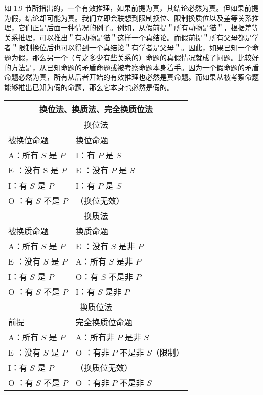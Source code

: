 如 1.9 节所指出的，一个有效推理，如果前提为真，其结论必然为真。但如果前提为假，结论却可能为真。我们立即会联想到限制换位、限制换质位以及差等关系推理，它们正是后面一种情况的例子。例如，从假前提＂所有动物是猫＂，根据差等关系推理，可以推出＂有动物是猫＂这样一个真结论。而假前提＂所有父母都是学者＂限制换位后也可以得到一个真结论＂有学者是父母＂。因此，如果已知一个命题为假，那么另一个（与之多少有些关系的）命题的真假情况就成了问题。比较好的方法是，从已知命题的矛盾命题或被考察命题本身着手。因为一个假命题的矛盾命题必然为真，所有从后者开始的有效推理也必然是真命题。而如果从被考察命题能够推出已知为假的命题，那么它本身也必然是假的。

\begin{center}
\begin{tabular}{|l|l|}
\hline
\multicolumn{2}{|c|}{换位法、换质法、完全换质位法} \\
\hline
\multicolumn{2}{|c|}{换位法} \\
\hline
被换位命题 & 换位命题 \\
\hline
A：所有 $S$ 是 $P$ & I：有 $P$ 是 $S$ \\
\hline
E ：没有 S 是 $P$ & E ：没有 $P$ 是 $S$ \\
\hline
I：有 $S$ 是 $P$ & I：有 $P$ 是 $S$ \\
\hline
O ：有 $S$ 不是 $P$ & （换位无效） \\
\hline
\multicolumn{2}{|c|}{换质法} \\
\hline
被换质命题 & 换质命题 \\
\hline
A：所有 $S$ 是 $P$ & E ：没有 $S$ 是非 $P$ \\
\hline
E ：没有 $S$ 是 $P$ & A：所有 $S$ 是非 $P$ \\
\hline
I：有 $S$ 是 $P$ & O：有 $S$ 不是非 $P$ \\
\hline
O ：有 $S$ 不是 $P$ & I：有 $S$ 是非 $P$ \\
\hline
\multicolumn{2}{|c|}{换质位法} \\
\hline
前提 & 完全换质位命题 \\
\hline
A：所有 $S$ 是 $P$ & A：所有非 $P$ 是非 $S$ \\
\hline
E ：没有 $S$ 是 $P$ & O ：有非 $P$ 不是非 $S$（限制） \\
\hline
I：有 $S$ 是 $P$ & （换质位无效） \\
\hline
O ：有 $S$ 不是 $P$ & O ：有非 $P$ 不是非 $S$ \\
\hline
\end{tabular}
\end{center}


